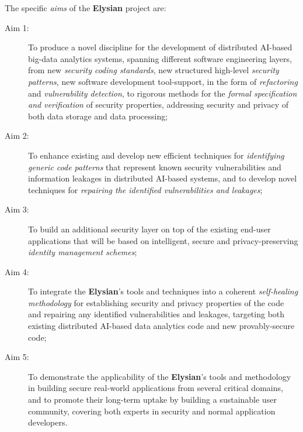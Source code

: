 \documentclass[a4paper,11pt]{article}
\newcommand{\project}[1]{\textbf{#1}\xspace}
\newcommand{\SECURITY}{\project{Elysian}}
\newcommand{\TheProject}{\SECURITY}
\begin{document}


The specific \emph{aims} of the \TheProject{} project are:

\begin{description}
\item[Aim 1:] To produce a novel discipline for the development of distributed AI-based big-data analytics systems, spanning different software engineering layers, from new \emph{security coding standards}, new structured high-level \emph{security patterns}, new software development tool-support, in the form of \emph{refactoring} and \emph{vulnerability detection}, to rigorous methods for the \emph{formal specification and verification} of security properties, addressing security and privacy of both data storage and data processing;

\item[Aim 2:] To %
enhance existing and develop new efficient techniques for \emph{identifying generic code patterns} that
  represent known security vulnerabilities and information leakages in distributed AI-based systems, and to develop novel techniques for  
  \emph{repairing the identified vulnerabilities and leakages};

\item[Aim 3:] To build an additional security layer on top of the existing end-user applications that will be based on intelligent, secure and privacy-preserving \emph{identity management schemes};

\item[Aim 4:] To integrate the \TheProject{}'s tools and techniques into a coherent \emph{self-healing methodology} for establishing
  security and privacy properties of the code and repairing any identified vulnerabilities and leakages, targeting both 
  existing distributed AI-based data analytics code and new provably-secure code;

\item[Aim 5:]  To demonstrate the applicability of the \TheProject{}'s tools and
 methodology in building secure real-world applications from 
 several critical %
 domains, and to promote their long-term uptake by building a sustainable user community,
 covering both experts in security and normal application developers.

\end{description}
\end{document}
